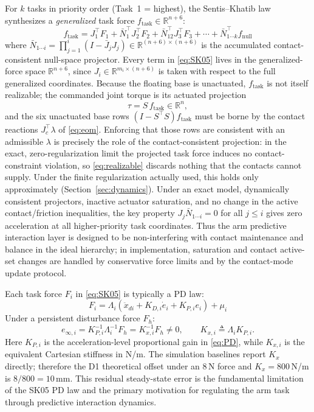 For $k$ tasks in priority order (Task~1 = highest), the Sentis--Khatib
law~\cite{sentis2005synthesis} synthesizes a \emph{generalized} task force
$f_{\text{task}}\in\mathbb{R}^{n+6}$:
\begin{equation}\label{eq:SK05}
  f_{\text{task}} = J_1^\top F_1 + \bar{N}_1^\top J_2^\top F_2
       + \bar{N}_{12}^\top J_3^\top F_3 + \cdots
       + \bar{N}_{1\cdots k}^\top f_{\text{null}}
\end{equation}
where $\bar{N}_{1\cdots i}=\prod_{j=1}^{i}(I-\bar{J}_jJ_j)
\in\mathbb{R}^{(n+6)\times(n+6)}$ is the accumulated contact-consistent
null-space projector. Every term in \eqref{eq:SK05} lives in the
generalized-force space $\mathbb{R}^{n+6}$, since $J_i\in\mathbb{R}^{m_i
\times(n+6)}$ is taken with respect to the full generalized coordinates.
Because the floating base is unactuated, $f_{\text{task}}$ is not itself
realizable; the commanded joint torque is its actuated projection
\begin{equation}\label{eq:realizable}
  \tau = S\,f_{\text{task}}\in\mathbb{R}^{n},
\end{equation}
and the six unactuated base rows $(I-S^\top S)f_{\text{task}}$ must be borne
by the contact reactions $J_c^\top\lambda$ of \eqref{eq:eom}. Enforcing that
those rows are consistent with an admissible $\lambda$ is precisely the role
of the contact-consistent projection: in the exact, zero-regularization limit
the projected task force induces no contact-constraint violation, so
\eqref{eq:realizable} discards nothing that the contacts cannot supply.
Under the finite regularization actually used, this holds only approximately
(Section~\ref{sec:dynamics}).
Under an exact model, dynamically consistent projectors, inactive actuator
saturation, and no change in the active contact/friction inequalities, the
key property $J_j\bar{N}_{1\cdots i}=0$ for all $j\leq i$ gives zero
acceleration at all higher-priority task coordinates.
Thus the arm predictive interaction layer is designed to be non-interfering
with contact maintenance and balance in the ideal hierarchy; in
implementation, saturation and contact active-set changes are handled by
conservative force limits and by the contact-mode update protocol.

Each task force $F_i$ in \eqref{eq:SK05} is typically a PD law:
\begin{equation}\label{eq:PD}
  F_i = \Lambda_i(\ddot{x}_{di}+K_{D,i}\dot{e}_i+K_{P,i}e_i)+\mu_i
\end{equation}
Under a persistent disturbance force $F_h$:
\begin{equation}\label{eq:sse}
  e_{\infty,i}
  = K_{P,i}^{-1}\Lambda_i^{-1}F_h
  = K_{x,i}^{-1}F_h \neq 0,\qquad
  K_{x,i}\triangleq\Lambda_iK_{P,i}.
\end{equation}
Here $K_{P,i}$ is the acceleration-level proportional gain in
\eqref{eq:PD}, while $K_{x,i}$ is the equivalent Cartesian stiffness in
N/m. The simulation baselines report $K_x$ directly; therefore the D1
theoretical offset under an 8\,N force and $K_x=800$\,N/m is
$8/800=10$\,mm.
This residual steady-state error is the fundamental limitation of the SK05
PD law and the primary motivation for regulating the arm task through
predictive interaction dynamics.

